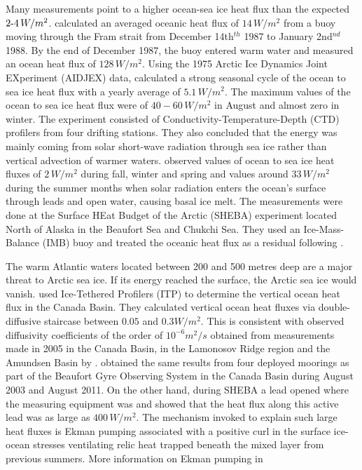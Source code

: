 Many measurements point to a higher ocean-sea ice heat flux than the expected $2{\text -}4 \,W/m^2$. \citet{ISI:A1989AP36800003} calculated an averaged oceanic heat flux of $14 \, W/m^2$ from a buoy moving through the Fram strait from December 14th$^{th}$ 1987 to January 2nd$^{nd}$ 1988. By the end of December 1987, the buoy entered warm water and measured an ocean heat flux of $128 \, W/m^2$. Using the 1975 Arctic Ice Dynamics Joint EXperiment (AIDJEX) data, \citet{4164498} calculated a strong seasonal cycle of the ocean to sea ice heat flux with a yearly average of $5.1 \, W/m^2$. The maximum values of the ocean to sea ice heat flux were of $40-60 \, W/m^2$ in August and almost zero in winter. The experiment consisted of Conductivity-Temperature-Depth (CTD) profilers from four drifting stations. They also concluded that the energy was mainly coming from solar short-wave radiation through sea ice rather than vertical advection of warmer waters. \citet{GRL:GRL15407} observed values of ocean to sea ice heat fluxes of $2 \, W/m^2$ during fall, winter and spring and values around $33 \, W/m^2$ during the summer months when solar radiation enters the ocean's surface through leads and open water, causing basal ice melt. The measurements were done at the Surface HEat Budget of the Arctic (SHEBA) experiment located North of Alaska in the Beaufort Sea and Chukchi Sea. They used an Ice-Mass-Balance (IMB) buoy and treated the oceanic heat flux as a residual following \citet{ISI:A1982NF38100017}. 

The warm Atlantic waters located between 200 and 500 metres deep are a major threat to Arctic sea ice. If its energy reached the surface, the Arctic sea ice would vanish. \citet{Timmermans:2008fk} used Ice-Tethered Profilers (ITP) to determine the vertical ocean heat flux in the Canada Basin. They calculated vertical ocean heat fluxes via double-diffusive staircase between $0.05$ and  $0.3 W/m^2$. This is consistent with observed diffusivity coefficients of the order of $10^{-6} m^2/s$ obtained from  measurements made in 2005 in the Canada Basin, in the Lamonosov Ridge region and the Amundsen Basin by \citet{GRL:GRL24453}. \cite{Lique:2013uq} obtained the same results from four deployed moorings as part of the Beaufort Gyre Observing System in the Canada Basin during August 2003 and August 2011. On the other hand, during SHEBA a lead opened where the measuring equipment was and \citet{McPhee:2005uq} showed that the heat flux along this active lead was as large as $400 \, W/m^2$. The mechanism invoked to explain such large heat fluxes is Ekman pumping associated with a positive curl in the surface ice-ocean stresses ventilating relic heat trapped beneath the mixed layer from previous summers. More information on Ekman pumping in \cite{vallis}

